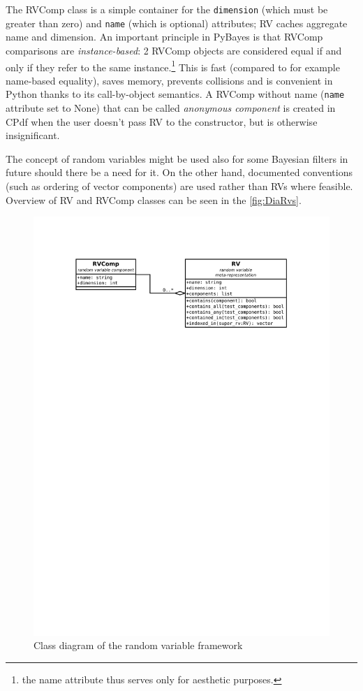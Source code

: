 The RVComp class is a simple container for the \verb|dimension| (which must be greater than zero)
and \verb|name| (which is optional) attributes; RV caches aggregate name and dimension. An important principle in
PyBayes is that RVComp comparisons are \emph{instance-based}: 2 RVComp objects are considered equal
if and only if they refer to the same instance.\footnote{the name attribute thus serves only for
aesthetic purposes.} This is fast (compared to for example name-based equality), saves memory,
prevents collisions and is convenient in Python thanks to its call-by-object semantics. A RVComp
without name (\verb|name| attribute set to None) that can be called \emph{anonymous component} is
created in CPdf when the user doesn't pass RV to the constructor, but is otherwise insignificant.

The concept of random variables might be used also for some Bayesian filters in future should there
be a need for it. On the other hand, documented conventions (such as ordering of vector components)
are used rather than RVs where feasible. Overview of RV and RVComp classes can be seen in the
\autoref{fig:DiaRvs}.

\begin{figure}[h]
	\centering
	\includegraphics[width=\textwidth,keepaspectratio=true,clip=true,trim=3cm 218mm 3cm 3cm]{./diagrams/rvs.pdf}
	\vspace{-8mm}
	\caption{Class diagram of the random variable framework}
	\label{fig:DiaRvs}
\end{figure}

